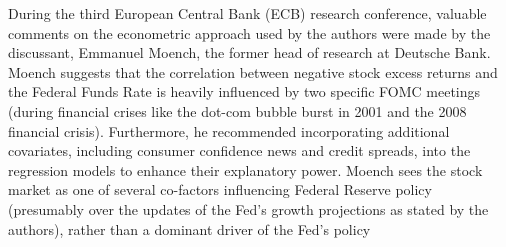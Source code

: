During the third European Central Bank (ECB) research conference, valuable comments on the econometric approach used by the authors were made by the discussant, Emmanuel Moench, the former head of research at Deutsche Bank. Moench suggests that the correlation between negative stock excess returns and the Federal Funds Rate is heavily influenced by two specific FOMC meetings (during financial crises like the dot-com bubble burst in 2001 and the 2008 financial crisis). Furthermore, he recommended incorporating additional covariates, including consumer confidence news and credit spreads, into the regression models to enhance their explanatory power. Moench sees the stock market as one of several co-factors influencing Federal Reserve policy (presumably over the updates of the Fed's growth projections as stated by the authors), rather than a dominant driver of the Fed's policy \parencite{european_central_bank_third_2018}


